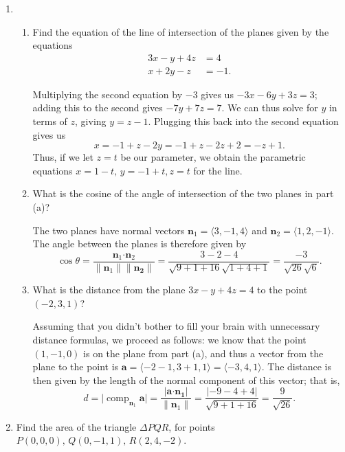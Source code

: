 \documentclass[12pt]{article}
\newcommand{\points}[1]{\marginpar{\hspace{24pt}[#1]}}
\newcommand{\aaa}{\mathbf{a}}
\newcommand{\abs}[1]{\lvert #1\rvert}
\newcommand{\len}[1]{\lVert #1\rVert}
\DeclareMathOperator{\comp}{comp}
\newcommand{\dotp}{\boldsymbol{\cdot}}
\begin{document}
\begin{enumerate}
\item \begin{enumerate}
\item Find the equation of the line of intersection of the planes given by the equations \points{8}
\begin{align*}
3x - y + 4z & = 4\\
x + 2y - z & = -1.
\end{align*}

\bigskip

Multiplying the second equation by $-3$ gives us $-3x-6y+3z=3$; adding this to the second gives $-7y+7z=7$. We can thus solve for $y$ in terms of $z$, giving $y=z-1$. Plugging this back into the second equation gives us
\[
x = -1+z-2y = -1+z-2z+2 = -z+1.
\]
Thus, if we let $z=t$ be our parameter, we obtain the parametric equations $x=1-t,\,y=-1+t,z=t$ for the line.

\vspace{1in}

\item What is the cosine of the angle of intersection of the two planes in part (a)? \points{2}


\bigskip

The two planes have normal vectors $\mathbf{n}_1 = \langle 3,-1,4\rangle$ and $\mathbf{n}_2 = \langle 1,2,-1\rangle$. The angle between the planes is therefore given by
\[
\cos\theta = \frac{\mathbf{n}_1\dotp\mathbf{n}_2}{\len{\mathbf{n}_1}\len{\mathbf{n_2}}} = \frac{3-2-4}{\sqrt{9+1+16}\sqrt{1+4+1}} = \frac{-3}{\sqrt{26}\sqrt{6}}.
\]


\bigskip


\item What is the distance from the plane $3x-y+4z=4$ to the point $(-2,3,1)$? \points{3}

\bigskip

Assuming that you didn't bother to fill your brain with unnecessary distance formulas, we proceed as follows: we know that the point $(1,-1,0)$ is on the plane from part (a), and thus a vector from the plane to the point is $\aaa = \langle -2-1,3+1,1\rangle =\langle -3,4,1\rangle$. The distance is then given by the length of the normal component of this vector; that is,
\[
d = \abs{\comp_{\mathbf{n}_1}\aaa} = \frac{\abs{\aaa\dotp\mathbf{n_1}}}{\len{\mathbf{n}_1}} = \frac{\abs{-9-4+4}}{\sqrt{9+1+16}}=\frac{9}{\sqrt{26}}.
\]
\end{enumerate}

\newpage

\item Find the area of the triangle $\Delta PQR$, for points $P(0,0,0),\, Q(0,-1,1),\, R(2,4,-2)$. \points{7}


\end{enumerate}
\end{document}
